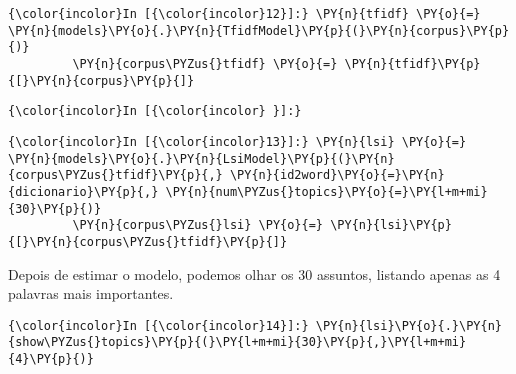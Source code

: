     \begin{Verbatim}[commandchars=\\\{\}]
{\color{incolor}In [{\color{incolor}12}]:} \PY{n}{tfidf} \PY{o}{=} \PY{n}{models}\PY{o}{.}\PY{n}{TfidfModel}\PY{p}{(}\PY{n}{corpus}\PY{p}{)}
         \PY{n}{corpus\PYZus{}tfidf} \PY{o}{=} \PY{n}{tfidf}\PY{p}{[}\PY{n}{corpus}\PY{p}{]}
\end{Verbatim}

    \begin{Verbatim}[commandchars=\\\{\}]
{\color{incolor}In [{\color{incolor} }]:} 
\end{Verbatim}

    \begin{Verbatim}[commandchars=\\\{\}]
{\color{incolor}In [{\color{incolor}13}]:} \PY{n}{lsi} \PY{o}{=} \PY{n}{models}\PY{o}{.}\PY{n}{LsiModel}\PY{p}{(}\PY{n}{corpus\PYZus{}tfidf}\PY{p}{,} \PY{n}{id2word}\PY{o}{=}\PY{n}{dicionario}\PY{p}{,} \PY{n}{num\PYZus{}topics}\PY{o}{=}\PY{l+m+mi}{30}\PY{p}{)}
         \PY{n}{corpus\PYZus{}lsi} \PY{o}{=} \PY{n}{lsi}\PY{p}{[}\PY{n}{corpus\PYZus{}tfidf}\PY{p}{]}
\end{Verbatim}

    Depois de estimar o modelo, podemos olhar os 30 assuntos, listando
apenas as 4 palavras mais importantes.

    \begin{Verbatim}[commandchars=\\\{\}]
{\color{incolor}In [{\color{incolor}14}]:} \PY{n}{lsi}\PY{o}{.}\PY{n}{show\PYZus{}topics}\PY{p}{(}\PY{l+m+mi}{30}\PY{p}{,}\PY{l+m+mi}{4}\PY{p}{)}
\end{Verbatim}

